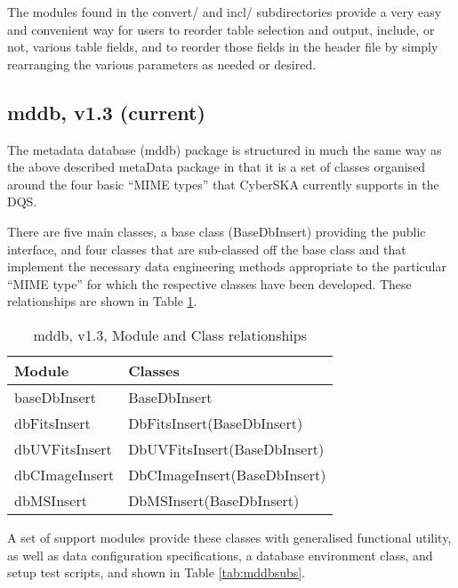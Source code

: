 The modules found in the convert/ and incl/ subdirectories provide a very
easy and convenient way for users to reorder table selection and output, include, or not, 
various table fields, and to reorder those fields in the header file by simply rearranging
the various parameters as needed or desired.

\subsection{mddb, v1.3 (current)}
\label{sec:mddb}
The metadata database (mddb) package is structured in much the same
way as the above described metaData package in that it is a set of classes
organised around the four basic ``MIME types'' that CyberSKA currently
supports in the DQS.

There are five main classes, a base class (BaseDbInsert)
providing the public interface, and four classes that are
sub-classed off the base class and that implement the
necessary data engineering methods appropriate to the particular
``MIME type'' for which the respective classes have been
developed. These relationships are shown in Table \ref{tab:mddbmods}.

\begin{table}[htbp]
  \centering
  \begin{tabular}{|l|p{8.0cm}|} 
    \hline
    \sc \textbf{Module} & \textbf{Classes} \\
    \hline
    baseDbInsert & BaseDbInsert \\
    dbFitsInsert   & DbFitsInsert(BaseDbInsert) \\
    dbUVFitsInsert& DbUVFitsInsert(BaseDbInsert)\\
    dbCImageInsert& DbCImageInsert(BaseDbInsert)\\
    dbMSInsert & DbMSInsert(BaseDbInsert)\\
    \hline
  \end{tabular}
  \caption{mddb, v1.3, Module and Class relationships}
  \label{tab:mddbmods}
\end{table}

A set of support modules provide these classes with generalised
functional utility, as well as data configuration specifications, a
database environment class, and setup test scripts, and shown in Table \ref{tab:mddbsubs}.

